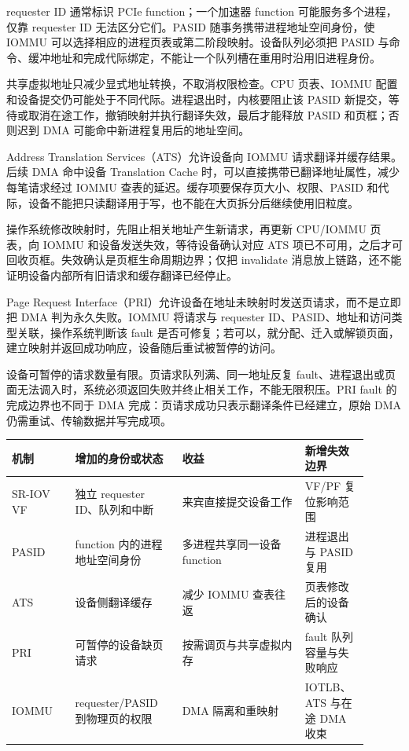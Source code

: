 requester ID 通常标识 PCIe function；一个加速器 function 可能服务多个进程，仅靠 requester ID 无法区分它们。PASID 随事务携带进程地址空间身份，使 IOMMU 可以选择相应的进程页表或第二阶段映射。设备队列必须把 PASID 与命令、缓冲地址和完成代际绑定，不能让一个队列槽在重用时沿用旧进程身份。

共享虚拟地址只减少显式地址转换，不取消权限检查。CPU 页表、IOMMU 配置和设备提交仍可能处于不同代际。进程退出时，内核要阻止该 PASID 新提交，等待或取消在途工作，撤销映射并执行翻译失效，最后才能释放 PASID 和页框；否则迟到 DMA 可能命中新进程复用后的地址空间。


Address Translation Services（ATS）允许设备向 IOMMU 请求翻译并缓存结果。后续 DMA 命中设备 Translation Cache 时，可以直接携带已翻译地址属性，减少每笔请求经过 IOMMU 查表的延迟。缓存项要保存页大小、权限、PASID 和代际，设备不能把只读翻译用于写，也不能在大页拆分后继续使用旧粒度。

操作系统修改映射时，先阻止相关地址产生新请求，再更新 CPU/IOMMU 页表，向 IOMMU 和设备发送失效，等待设备确认对应 ATS 项已不可用，之后才可回收页框。失效确认是页框生命周期边界；仅把 invalidate 消息放上链路，还不能证明设备内部所有旧请求和缓存翻译已经停止。


Page Request Interface（PRI）允许设备在地址未映射时发送页请求，而不是立即把 DMA 判为永久失败。IOMMU 将请求与 requester ID、PASID、地址和访问类型关联，操作系统判断该 fault 是否可修复；若可以，就分配、迁入或解锁页面，建立映射并返回成功响应，设备随后重试被暂停的访问。

设备可暂停的请求数量有限。页请求队列满、同一地址反复 fault、进程退出或页面无法调入时，系统必须返回失败并终止相关工作，不能无限积压。PRI fault 的完成边界也不同于 DMA 完成：页请求成功只表示翻译条件已经建立，原始 DMA 仍需重试、传输数据并写完成项。

\begin{longtable}{L{0.16\linewidth}L{0.27\linewidth}L{0.31\linewidth}L{0.16\linewidth}}
\toprule
机制 & 增加的身份或状态 & 收益 & 新增失效边界 \\
\midrule
SR-IOV VF & 独立 requester ID、队列和中断 & 来宾直接提交设备工作 & VF/PF 复位影响范围 \\\tablerowrule
PASID & function 内的进程地址空间身份 & 多进程共享同一设备 function & 进程退出与 PASID 复用 \\\tablerowrule
ATS & 设备侧翻译缓存 & 减少 IOMMU 查表往返 & 页表修改后的设备确认 \\\tablerowrule
PRI & 可暂停的设备缺页请求 & 按需调页与共享虚拟内存 & fault 队列容量与失败响应 \\\tablerowrule
IOMMU & requester/PASID 到物理页的权限 & DMA 隔离和重映射 & IOTLB、ATS 与在途 DMA 收束 \\
\bottomrule
\end{longtable}
